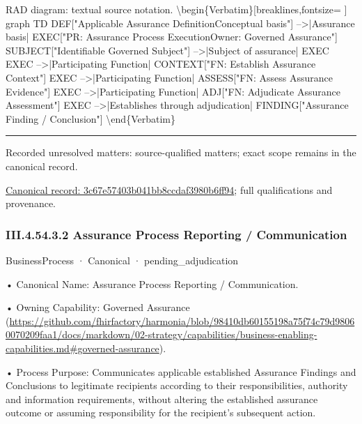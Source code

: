 RAD diagram: textual source notation.
\textbackslash{}begin\{Verbatim\}[breaklines,fontsize=
]
graph TD
    DEF["Applicable Assurance Definition\newline{}Conceptual basis"] -->|Assurance basis| EXEC["PR: Assurance Process Execution\newline{}Owner: Governed Assurance"]
    SUBJECT["Identifiable Governed Subject"] -->|Subject of assurance| EXEC
    EXEC -->|Participating Function| CONTEXT["FN: Establish Assurance Context"]
    EXEC -->|Participating Function| ASSESS["FN: Assess Assurance Evidence"]
    EXEC -->|Participating Function| ADJ["FN: Adjudicate Assurance Assessment"]
    EXEC -->|Establishes through adjudication| FINDING["Assurance Finding / Conclusion"]
\textbackslash{}end\{Verbatim\}



\medskip\hrule\medskip

{\small Recorded unresolved matters: source-qualified matters; exact scope remains in the canonical record.}\par
{\footnotesize \href{../../../../continuum/business/business-process/3c67e57403b041bb8ccdaf3980b6ff94.md}{Canonical record: 3c67e57403b041bb8ccdaf3980b6ff94}; full qualifications and provenance.}\par
\subsubsection*{III.4.54.3.2 Assurance Process Reporting / Communication}
\label{navigation:III.4.54.3.2}

\label{element:2fc0b626577b43feb050bcd91ac2b0a9}
{\small BusinessProcess · Canonical · pending\_adjudication}\par

•
Canonical Name: Assurance Process Reporting / Communication.



•
Owning Capability: Governed Assurance (\url{https://github.com/fhirfactory/harmonia/blob/98410db60155198a75f74c79d98060070209faa1/docs/markdown/02-strategy/capabilities/business-enabling-capabilities.md#governed-assurance}).



•
Process Purpose: Communicates applicable established Assurance Findings and Conclusions to legitimate recipients according to their responsibilities, authority and information requirements, without altering the established assurance outcome or assuming responsibility for the recipient's subsequent action.



